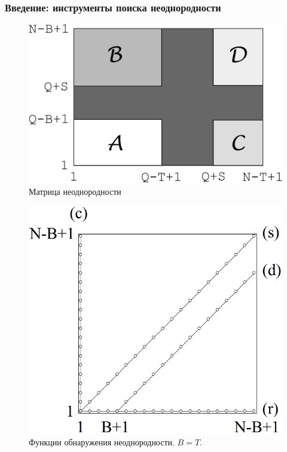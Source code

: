 \documentclass[pdf, 9pt,intlimits, unicode]{beamer}
\begin{document}
	\begin{frame}
		\bigskip
		\frametitle{Введение: инструменты поиска неоднородности}
		\begin{multicols}{2}
			
			\begin{figure}
				\center
				\includegraphics[width=\linewidth, height=0.8\linewidth]{imgs/H-matrix}\caption{Матрица неоднородности}\par 
			\end{figure}
			\begin{figure} 
				\center
				\includegraphics[width=\linewidth, height=0.8\linewidth]{imgs/det_funcs}
				\caption{Функции обнаружения неоднородности. $ B=T $.}\par 
			\end{figure}
		\end{multicols}
	

\end{frame}
\end{document}
